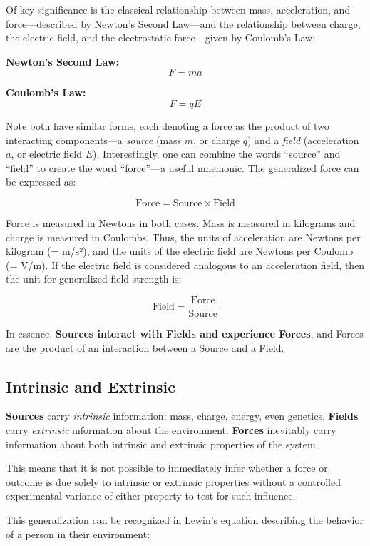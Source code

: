 \documentclass[
]{article}
\begin{document}
Of key significance is the classical relationship between mass,
acceleration, and force---described by Newton's Second Law---and the
relationship between charge, the electric field, and the electrostatic
force---given by Coulomb's Law:

\textbf{Newton's Second Law:} \[F = ma\]

\textbf{Coulomb's Law:} \[F = qE\]

Note both have similar forms, each denoting a force as the product of
two interacting components---a \emph{source} (mass \(m\), or charge
\(q\)) and a \emph{field} (acceleration \(a\), or electric field \(E\)).
Interestingly, one can combine the words ``source'' and ``field'' to
create the word ``force''---a useful mnemonic. The generalized force can
be expressed as:

\[\boxed{\text{Force} = \text{Source} \times \text{Field}}\]

Force is measured in Newtons in both cases. Mass is measured in
kilograms and charge is measured in Coulombs. Thus, the units of
acceleration are Newtons per kilogram (= m/s²), and the units of the
electric field are Newtons per Coulomb (= V/m). If the electric field is
considered analogous to an acceleration field, then the unit for
generalized field strength is:

\[\text{Field} = \frac{\text{Force}}{\text{Source}}\]

In essence, \textbf{Sources interact with Fields and experience Forces},
and Forces are the product of an interaction between a Source and a
Field.

\subsection{Intrinsic and Extrinsic}\label{intrinsic-and-extrinsic}

\textbf{Sources} carry \emph{intrinsic} information: mass, charge,
energy, even genetics. \textbf{Fields} carry \emph{extrinsic}
information about the environment. \textbf{Forces} inevitably carry
information about both intrinsic and extrinsic properties of the system.

This means that it is not possible to immediately infer whether a force
or outcome is due solely to intrinsic or extrinsic properties without a
controlled experimental variance of either property to test for such
influence.

This generalization can be recognized in Lewin's equation describing the
behavior of a person in their environment:
\end{document}
